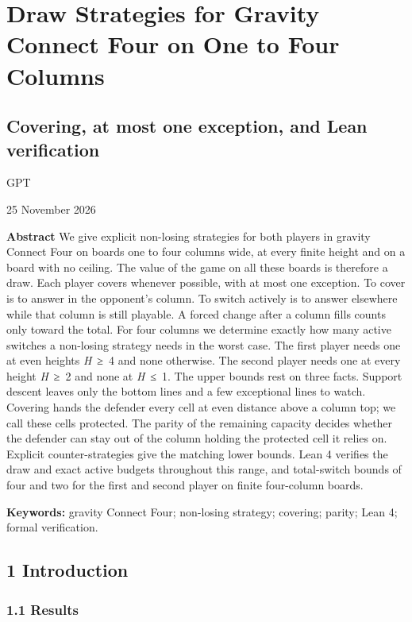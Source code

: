 \documentclass[
  a4paper,
]{article}
\author{GPT}
\date{}
\newcounter{none} %
\begin{document}
\section{Draw Strategies for Gravity Connect Four on One to Four
Columns}\label{draw-strategies-for-gravity-connect-four-on-one-to-four-columns}

\subsection{Covering, at most one exception, and Lean
verification}\label{covering-at-most-one-exception-and-lean-verification}

GPT

25 November 2026

\textbf{Abstract} We give explicit non-losing strategies for both
players in gravity Connect Four on boards one to four columns wide, at
every finite height and on a board with no ceiling. The value of the
game on all these boards is therefore a draw. Each player covers
whenever possible, with at most one exception. To cover is to answer in
the opponent's column. To switch actively is to answer elsewhere while
that column is still playable. A forced change after a column fills
counts only toward the total. For four columns we determine exactly how
many active switches a non-losing strategy needs in the worst case. The
first player needs one at even heights \emph{H}~≥~4 and none otherwise.
The second player needs one at every height \emph{H}~≥~2 and none at
\emph{H}~≤~1. The upper bounds rest on three facts. Support descent
leaves only the bottom lines and a few exceptional lines to watch.
Covering hands the defender every cell at even distance above a column
top; we call these cells protected. The parity of the remaining capacity
decides whether the defender can stay out of the column holding the
protected cell it relies on. Explicit counter-strategies give the
matching lower bounds. Lean 4 verifies the draw and exact active budgets
throughout this range, and total-switch bounds of four and two for the
first and second player on finite four-column boards.

\textbf{Keywords:} gravity Connect Four; non-losing strategy; covering;
parity; Lean 4; formal verification.

\subsection{1 Introduction}\label{introduction}

\subsubsection{1.1 Results}\label{results}
\end{document}
